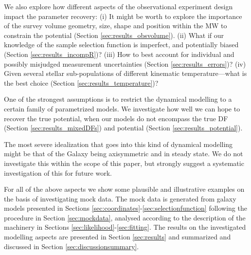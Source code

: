 We also explore how different aspects of the observational experiment design impact the parameter recovery: (i) It might be worth to explore the importance of the survey volume geometry, size, shape and position within the MW to constrain the potential (Section \ref{sec:results_obsvolume}). (ii) What if our knowledge of the sample selection function is imperfect, and potentially biased (Section \ref{sec:results_incompR})? (iii) How to best account for individual and possibly misjudged measurement uncertainties (Section \ref{sec:results_errors})? (iv) Given several stellar sub-populations of different kinematic temperature---what is the best choice (Section \ref{sec:results_temperature})? 

One of the strongest assumptions is to restrict the dynamical modelling to a certain family of parametrized models. We investigate how well we can hope to recover the true potential, when our models do not encompass the true DF (Section \ref{sec:results_mixedDFs}) and potential (Section \ref{sec:results_potential}).

The most severe idealization that goes into this kind of dynamical modelling might be that of the Galaxy being axisymmetric and in steady state. We do not investigate this within the scope of this paper, but strongly suggest a systematic investigation of this for future work.

For all of the above aspects we show some plausible and illustrative examples on the basis of investigating mock data. The mock data is generated from galaxy models presented in Sections \ref{sec:coordinates}-\ref{sec:selectionfunction} following the procedure in Section \ref{sec:mockdata}, analysed according to the description of the \RM{} machinery in Sections \ref{sec:likelihood}-\ref{sec:fitting}. The results on the investigated modelling aspects are presented in Section \ref{sec:results} and summarized and discussed in Section \ref{sec:discussionsummary}.
